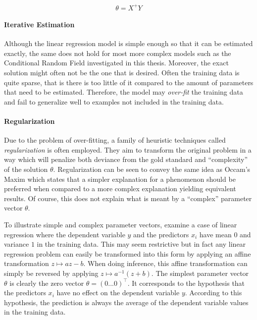 \begin{equation}
\theta = X^+ Y \label{eq:lss-exact}
\end{equation}

\paragraph{Iterative Estimation} Although the linear regression model
is simple enough so that it can be estimated exactly, the same does
not hold for most more complex models such as the Conditional Random
Field investigated in this thesis. Moreover, the exact solution might
often not be the one that is desired. Often the training data is quite
sparse, that is there is too little of it compared to the amount of
parameters that need to be estimated. Therefore, the model may {\it
  over-fit} the training data and fail to generalize well to examples
not included in the training data. 

\paragraph{Regularization} Due to the problem of over-fitting, a family
of heuristic techniques called {\it regularization} is often
employed. They aim to transform the original problem in a way which
will penalize both deviance from the gold standard and ``complexity''
of the solution $\theta$. Regularization can be seen to convey the
same idea as Occam's Maxim which states that a simpler explanation for
a phenomenon should be preferred when compared to a more complex
explanation yielding equivalent results. Of course, this does not
explain what is meant by a ``complex'' parameter vector $\theta$.

To illustrate simple and complex parameter vectors, examine a case of
linear regression where the dependent variable $y$ and the predictors
$x_i$ have mean $0$ and variance $1$ in the training data. This may
seem restrictive but in fact any linear regression problem can easily
be transformed into this form by applying an affine transformation $z
\mapsto az - b$. When doing inference, this affine transformation can
simply be reversed by applying $z \mapsto a^{-1} (z + b)$. The
simplest parameter vector $\theta$ is clearly the zero vector $\theta
= (0 ... 0)^\top$. It corresponds to the hypothesis that the
predictors $x_i$ have no effect on the dependent variable
$y$. According to this hypothesis, the prediction is always the
average of the dependent variable values in the training data.

